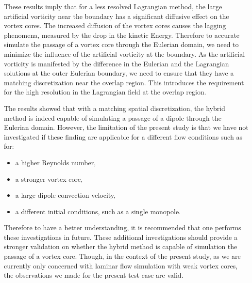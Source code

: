 These results imply that for a less resolved Lagrangian method, the large artificial vorticity near the boundary has a significant diffusive effect on the vortex cores. The increased diffusion of the vortex cores causes the lagging phenomena, measured by the drop in the kinetic Energy. Therefore to accurate simulate the passage of a vortex core through the Eulerian domain, we need to minimize the influence of the artificial vorticity at the boundary. As the artificial vorticity is manifested by the difference in the Eulerian and the Lagrangian solutions at the outer Eulerian boundary, we need to ensure that they have a matching discretization near the overlap region. This introduces the requirement for the high resolution in the Lagrangian field at the overlap region. 

The results showed that with a matching spatial discretization, the hybrid method is indeed capable of simulating a passage of a dipole through the Eulerian domain. However, the limitation of the present study is that we have not investigated if these finding are applicable for a different flow conditions such as for:
\begin{itemize}
\item a higher Reynolds number,
\item a stronger vortex core,
\item a large dipole convection velocity,
\item a different initial conditions, such as a single monopole.
\end{itemize}

Therefore to have a better understanding, it is recommended that one performs these investigations in future. These additional investigations should provide a stronger validation on whether the hybrid method is capable of simulation the passage of a vortex core. Though, in the context of the present study, as we are currently only concerned with laminar flow simulation with weak vortex cores, the observations we made for the present test case are valid.



